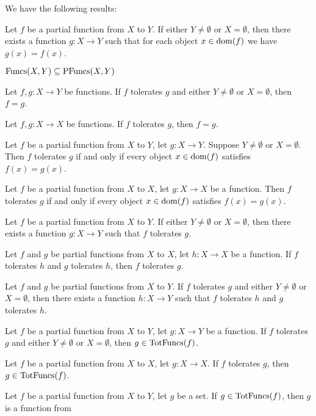 \documentclass{article}
\begin{document}
We have the following results:
\begin{thm}
\item\label{funct2:71} Let $f$ be a partial function from $X$ to $Y$. If
  either $Y\neq\emptyset$ or $X=\emptyset$, then there exists a function
  $g\colon X\to Y$ such that for each object $x\in\operatorname{dom}(f)$ we have $g(x)=f(x)$.
\item\label{funct2:72} $\operatorname{Funcs}(X,Y)\subseteq\operatorname{PFuncs}(X,Y)$
\item\label{funct2:73} Let $f,g\colon X\to Y$ be functions.
  If $f$ tolerates $g$ and either $Y\neq\emptyset$ or $X=\emptyset$,
  then $f=g$.
\item\label{funct2:74} Let $f,g\colon X\to X$ be functions.
  If $f$ tolerates $g$, then $f=g$.
\item\label{funct2:75} Let $f$ be a partial function from $X$ to $Y$,
  let $g\colon X\to Y$. Suppose $Y\neq\emptyset$ or $X=\emptyset$.
  Then $f$ tolerates $g$ if and only if every object $x\in\operatorname{dom}(f)$
  satisfies $f(x)=g(x)$.
\item\label{funct2:76} Let $f$ be a partial function from $X$ to $X$,
  let $g\colon X\to X$ be a function.
  Then $f$ tolerates $g$ if and only if every object $x\in\operatorname{dom}(f)$
  satisfies $f(x)=g(x)$.
\item\label{funct2:77} Let $f$ be a partial function from $X$ to $Y$.
  If either $Y\neq\emptyset$ or $X=\emptyset$, then there exists a
  function $g\colon X\to Y$ such that $f$ tolerates $g$.
\item\label{funct2:78} Let $f$ and $g$ be partial functions from $X$ to
  $X$, let $h\colon X\to X$ be a function.
  If $f$ tolerates $h$ and $g$ tolerates $h$, then $f$ tolerates $g$.
\item\label{funct2:79} Let $f$ and $g$ be partial functions from $X$ to $Y$.
  If $f$ tolerates $g$ and either $Y\neq\emptyset$ or $X=\emptyset$,
  then there exists a function $h\colon X\to Y$ such that $f$ tolerates
  $h$ and $g$ tolerates $h$.
\item\label{funct2:80} Let $f$ be a partial function from $X$ to $Y$,
  let $g\colon X\to Y$ be a function. If $f$ tolerates $g$ and either
  $Y\neq\emptyset$ or $X=\emptyset$, then $g\in\operatorname{TotFuncs}(f)$.
\item\label{funct2:81} Let $f$ be a partial function from $X$ to $X$,
  let $g\colon X\to X$. If $f$ tolerates $g$, then $g\in\operatorname{TotFuncs}(f)$.
\item\label{funct2:82} Let $f$ be a partial function from $X$ to $Y$,
  let $g$ be a set. If $g\in\operatorname{TotFuncs}(f)$, then $g$ is a function from

\end{thm}
\end{document}
